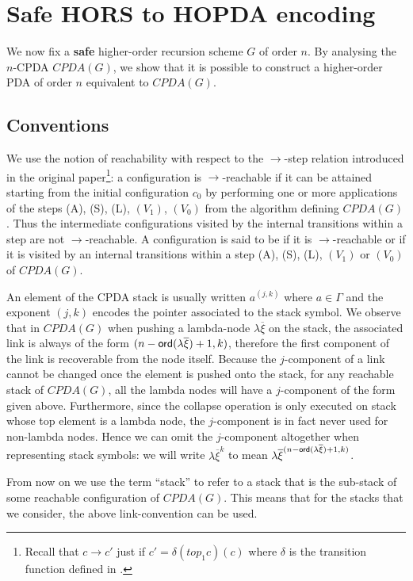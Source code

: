 \documentclass[a4paper]{article}
\theoremstyle{remark}
\theoremstyle{definition}
\begin{document}
\section{Safe HORS to HOPDA encoding}

We now fix a {\bf safe} higher-order recursion scheme $G$ of order $n$.
By analysing the $n$-CPDA $CPDA(G)$, we show that it is possible to construct a higher-order PDA of order $n$ equivalent to $CPDA(G)$.


\subsection{Conventions}
We use the notion of reachability with respect to the $\rightarrow$-step relation introduced in the original paper\footnote{Recall that $c\rightarrow c'$
just if $c' = \delta(top_1 c)(c)$ where $\delta$ is the transition
function defined in \cite[Figure 2]{hague-sto07}.}: a configuration is $\rightarrow$-reachable if it can be attained starting from the initial configuration $c_0$ by performing one or more applications of the steps (A), (S), (L), $(V_1)$, $(V_0)$ from the algorithm defining $CPDA(G)$.
Thus the intermediate configurations visited by the internal transitions within a step are not $\rightarrow$-reachable.
A configuration is said to be  if it is $\rightarrow$-reachable or if it is visited by an internal transitions
within a step (A), (S), (L), $(V_1)$ or $(V_0)$ of $CPDA(G)$.

An element of the CPDA stack is usually written $a^{(j,k)}$ where $a\in \Gamma$ and the exponent $(j,k)$
encodes the pointer associated to the stack symbol. We observe that in $CPDA(G)$ when pushing a lambda-node $\lambda \overline{\xi}$ on the stack, the associated link is always of the form $(n-{\sf ord}(\lambda \overline{\xi})+1, k)$, therefore the first component of the link is recoverable from the node itself. Because the $j$-component of a link cannot be changed once the element is pushed onto the stack, for any reachable stack of $CPDA(G)$, all the lambda nodes will have a $j$-component of the form given above.
Furthermore, since the collapse operation is only executed on stack whose top element is a lambda node, the $j$-component is in fact never used for non-lambda nodes.
Hence we can omit the $j$-component altogether when representing stack symbols:  we will write $\lambda \overline{\xi}^{k}$ to mean $\lambda \overline{\xi}^{(n-{\sf ord}(\lambda \overline{\xi})+1,k)}$.

From now on we use the term ``stack'' to refer to a stack that is the sub-stack of some reachable configuration of $CPDA(G)$. This means that for the stacks that we consider, the above link-convention
can be used.
\end{document}
